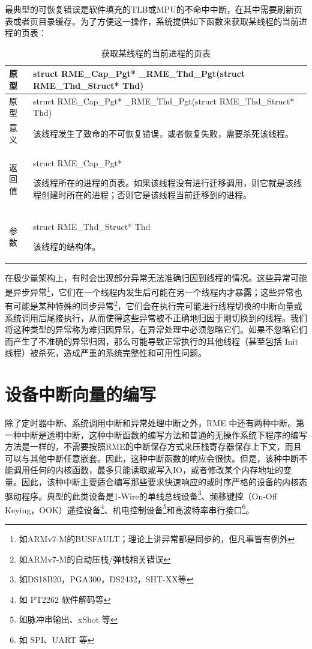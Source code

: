 最典型的可恢复错误是软件填充的TLB或MPU的不命中中断，在其中需要刷新页表或者页目录缓存。为了方便这一操作，系统提供如下函数来获取某线程的当前进程的页表：

\begin{xltabular}{\textwidth}{@{}>{\hsize\raggedright\arraybackslash}X>{\hsize\raggedright\arraybackslash}X@{}}
\caption{获取某线程的当前进程的页表}\label{tab:7-23-get-thread-current-process-page-table}\\
\toprule
原型 & struct RME\_Cap\_Pgt* \_RME\_Thd\_Pgt(struct RME\_Thd\_Struct*
Thd)\tabularnewline
\endfirsthead
\toprule
原型 & struct RME\_Cap\_Pgt* \_RME\_Thd\_Pgt(struct RME\_Thd\_Struct*
Thd)\tabularnewline
\midrule
\endhead
\bottomrule
\endlastfoot
意义 &
该线程发生了致命的不可恢复错误，或者恢复失败，需要杀死该线程。\tabularnewline
返回值\strut
 & struct RME\_Cap\_Pgt*

该线程所在的进程的页表。如果该线程没有进行迁移调用，则它就是该线程创建时所在的进程；否则它是该线程当前迁移到的进程。\strut
\tabularnewline
参数\strut
 & struct RME\_Thd\_Struct* Thd

该线程的结构体。\strut
\tabularnewline
\end{xltabular}

在极少量架构上，有时会出现部分异常无法准确归因到线程的情况。这些异常可能是异步异常\footnote{如ARMv7-M的BUSFAULT；理论上讲异常都是同步的，但凡事皆有例外}，它们在一个线程内发生后可能在另一个线程内才暴露；这些异常也有可能是某种特殊的同步异常\footnote{如ARMv7-M的自动压栈/弹栈相关错误}，它们会在执行完可能进行线程切换的中断向量或系统调用后尾接执行，从而使得这些异常被不正确地归因于刚切换到的线程。我们将这种类型的异常称为难归因异常，在异常处理中必须忽略它们。如果不忽略它们而产生了不准确的异常归因，那么可能导致正常执行的其他线程（甚至包括 Init 线程）被杀死，造成严重的系统完整性和可用性问题。

\section{设备中断向量的编写}\label{sec:7-device-interrupt-vector-writing}

除了定时器中断、系统调用中断和异常处理中断之外，RME 中还有两种中断。第一种中断是透明中断，这种中断函数的编写方法和普通的无操作系统下程序的编写方法是一样的，不需要按照RME的中断保存方式来压栈寄存器保存上下文，而且可以与其他中断任意嵌套。因此，这种中断函数的响应会很快。但是，该种中断不能调用任何的内核函数，最多只能读取或写入IO，或者修改某个内存地址的变量。因此，该种中断主要适合编写那些要求快速响应的或时序严格的设备的内核态驱动程序。典型的此类设备是1-Wire的单线总线设备\footnote{如DS18B20，PGA300，DS2432，SHT-XX等}、频移键控（On-Off
Keying，OOK）遥控设备\footnote{如 PT2262 软件解码等}、机电控制设备\footnote{如脉冲串输出、xShot 等}和高波特率串行接口\footnote{如 SPI、UART 等}。


